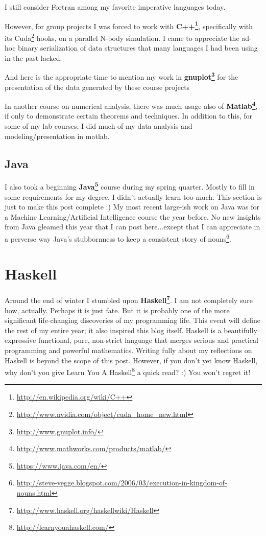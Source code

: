 \documentclass[]{article}
\renewcommand{\href}[2]{#2\footnote{\url{#1}}}
\begin{document}
I still consider Fortran among my favorite imperative languages today.

However, for group projects I was forced to work with
\textbf{\href{http://en.wikipedia.org/wiki/C++}{C++}}, specifically with its
\href{http://www.nvidia.com/object/cuda_home_new.html}{Cuda} hooks, on a
parallel N-body simulation. I came to appreciate the ad-hoc binary serialization
of data structures that many languages I had been using in the past lacked.

And here is the appropriate time to mention my work in
\textbf{\href{http://www.gnuplot.info/}{gnuplot}} for the presentation of the
data generated by these course projects

In another course on numerical analysis, there was much usage also of
\textbf{\href{http://www.mathworks.com/products/matlab/}{Matlab}}, if only to
demonstrate certain theorems and techniques. In addition to this, for some of my
lab courses, I did much of my data analysis and modeling/presentation in matlab.

\subsection{Java}

I also took a beginning \textbf{\href{https://www.java.com/en/}{Java}} course
during my spring quarter. Mostly to fill in some requirements for my degree, I
didn't actually learn too much. This section is just to make this post complete
:) My most recent large-ish work on Java was for a Machine Learning/Artificial
Intelligence course the year before. No new insights from Java gleamed this year
that I can post here...except that I can appreciate in a perverse way Java's
stubbornness to keep a consistent story of
\href{http://steve-yegge.blogspot.com/2006/03/execution-in-kingdom-of-nouns.html}{nouns}.

\section{Haskell}

Around the end of winter I stumbled upon
\textbf{\href{http://www.haskell.org/haskellwiki/Haskell}{Haskell}}. I am not
completely sure how, actually. Perhaps it is just fate. But it is probably one
of the more significant life-changing discoveries of my programming life. This
event will define the rest of my entire year; it also inspired this blog itself.
Haskell is a beautifully expressive functional, pure, non-strict language that
merges serious and practical programming and powerful mathematics. Writing fully
about my reflections on Haskell is beyond the scope of this post. However, if
you don't yet know Haskell, why don't you give
\href{http://learnyouahaskell.com/}{Learn You A Haskell} a quick read? :) You
won't regret it!
\end{document}
